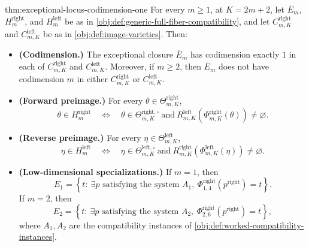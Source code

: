 \begin{theoremv}{thm:exceptional-locus-codimension-one}
For every \(m\geq 1\), at \(K=2m+2\), let \(\overline E_m\), \(H^{\mathrm{right}}_m\), and \(H^{\mathrm{left}}_m\) be as in \cref{obj:def:generic-full-fiber-compatibility}, and let \(C^{\mathrm{right}}_{m,K}\) and \(C^{\mathrm{left}}_{m,K}\) be as in \cref{obj:def:image-varieties}. Then:
\begin{itemize}
\item \textbf{(Codimension.)} The exceptional closure \(\overline E_m\) has codimension exactly \(1\) in each of \(C^{\mathrm{right}}_{m,K}\) and \(C^{\mathrm{left}}_{m,K}\). Moreover, if \(m\geq 2\), then \(\overline E_m\) does not have codimension \(m\) in either \(C^{\mathrm{right}}_{m,K}\) or \(C^{\mathrm{left}}_{m,K}\).

\item \textbf{(Forward preimage.)} For every \(\theta\in\Theta^{\mathrm{right}}_{m,K}\),
\[
\theta\in H^{\mathrm{right}}_m
\quad\Longleftrightarrow\quad
\theta\in\Theta^{\mathrm{right},\circ}_{m,K}
\ \text{and}\
R^{\mathrm{left}}_{m,K}\!\left(\Phi^{\mathrm{right}}_{m,K}(\theta)\right)\neq\varnothing .
\]

\item \textbf{(Reverse preimage.)} For every \(\eta\in\Theta^{\mathrm{left}}_{m,K}\),
\[
\eta\in H^{\mathrm{left}}_m
\quad\Longleftrightarrow\quad
\eta\in\Theta^{\mathrm{left},\circ}_{m,K}
\ \text{and}\
R^{\mathrm{right}}_{m,K}\!\left(\Phi^{\mathrm{left}}_{m,K}(\eta)\right)\neq\varnothing .
\]

\item \textbf{(Low-dimensional specializations.)} If \(m=1\), then
\[
E_1
=
\left\{
t:\ \exists p\text{ satisfying the system }A_1,\ 
\Phi^{\mathrm{right}}_{1,4}(p^{\mathrm{right}})=t
\right\}.
\]
If \(m=2\), then
\[
E_2
=
\left\{
t:\ \exists p\text{ satisfying the system }A_2,\ 
\Phi^{\mathrm{right}}_{2,6}(p^{\mathrm{right}})=t
\right\},
\]
where \(A_1,A_2\) are the compatibility instances of \cref{obj:def:worked-compatibility-instances}.
\end{itemize}
\end{theoremv}

